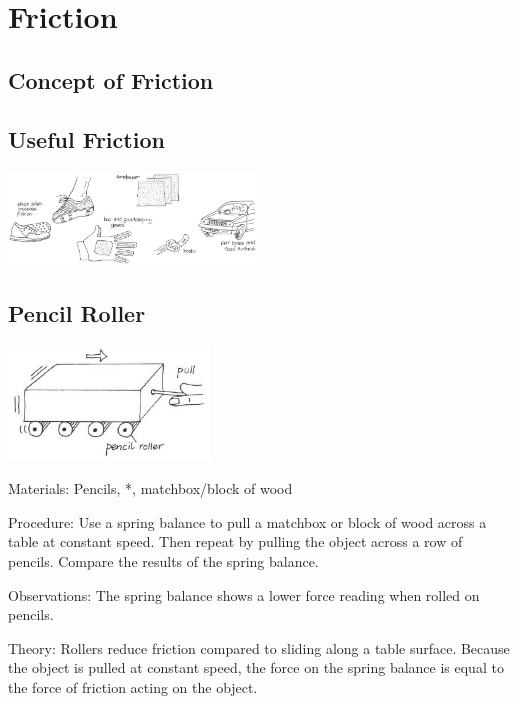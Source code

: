 \section{Friction}

\begin{multicols}{2}


\section*{Concept of Friction}


\subsection{Useful Friction}

\begin{center}
\includegraphics[width=0.5\textwidth]{./img/vso/useful-friction.png}
\end{center}

\subsection{Pencil Roller}

\begin{center}
\includegraphics[width=0.4\textwidth]{./img/vso/pencil-roller.png}
\end{center}

\begin{description*}
\item[Materials:]{Pencils, *, matchbox/block of wood}
\item[Procedure:]{Use a spring balance to pull a matchbox or block of wood across a table at constant speed. Then repeat by pulling the object across a row of pencils. Compare the results of the spring balance.}
\item[Observations:]{The spring balance shows a lower force reading when rolled on pencils.}
\item[Theory:]{Rollers reduce friction compared to sliding along a table surface. Because the object is pulled at constant speed, the force on the spring balance is equal to the force of friction acting on the object.}
\end{description*}


\end{multicols}

